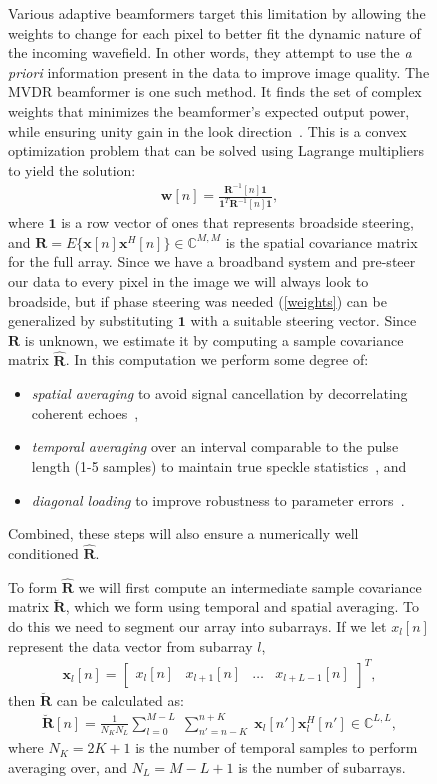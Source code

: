 \documentclass[12pt,journal,draftclsnofoot,onecolumn]{IEEEtran}
\newcommand\bmat[1]{\begin{bmatrix}#1\end{bmatrix}}
\newcommand\sumb[2]{\sum\limits_{#1}^{#2}\;}
\newcommand\T{^{\scriptscriptstyle T}}
\renewcommand\H{^{\scriptscriptstyle H}}
\renewcommand\vec[1]{\boldsymbol{#1}}
\newcommand\mat[1]{\boldsymbol{#1}}
\newcommand\1{\vec 1}
\newcommand*\x{\vec x}
\newcommand*\R{\mat R}
\newcommand*\Ri{\R^{-1}}
\newcommand*\eR{\mat{\hat R}}
\begin{document}
\begin{figure}[H]
Various adaptive beamformers target this limitation by allowing the weights to change for each pixel to better fit the dynamic nature of the incoming wavefield. In other words, they attempt to use the \emph{a priori} information present in the data to improve image quality. The MVDR beamformer is one such method. It finds the set of complex weights that minimizes the beamformer's expected output power, while ensuring unity gain in the look direction~\cite{Capon1969}. This is a convex optimization problem that can be solved using Lagrange multipliers to yield the solution:
\begin{gather}
\vec w[n] = \frac{\Ri[n]\1}{\1\T\Ri[n]\1},\label{weights}
\end{gather}
where $\1$ is a row vector of ones that represents broadside steering, and $\R=E\{\x[n]\x\H[n]\} \in\mathbb{C}^{M,M}$ is the spatial covariance matrix for the full array. Since we have a broadband system and pre-steer our data to every pixel in the image we will always look to broadside, but if phase steering was needed (\ref{weights}) can be generalized by substituting $\1$ with a suitable steering vector. Since $\R$ is unknown, we estimate it by computing a sample covariance matrix $\eR$. In this computation we perform some degree of:
\begin{itemize}
\item \emph{spatial averaging} to avoid signal cancellation by decorrelating coherent echoes~\cite{Kailath1985},
\item \emph{temporal averaging} over an interval comparable to the pulse length (1-5 samples) to maintain true speckle statistics~\cite{Synnevag2009a}, and
\item \emph{diagonal loading} to improve robustness to parameter errors~\cite{Cox1987,Maksym1979}.
\end{itemize}%
%
%
Combined, these steps will also ensure a numerically well conditioned $\eR$.

To form $\eR$ we will first compute an intermediate sample covariance matrix $\breve{\R}$, which we form using temporal and spatial averaging. To do this we need to segment our array into subarrays. If we let $x_l[n]$ represent the data vector from subarray $l$,
\begin{gather}
\x_l[n] = \bmat{x_l[n] & x_{l+1}[n] & \dots & x_{l+L-1}[n]}\T,
\end{gather}
then $\breve{\R}$ can be calculated as:
\begin{gather}
\breve{\R}[n] =  \frac{1}{N_K N_L} \sumb{l=0}{M-L}\sumb{n'=n-K}{n+K} \x_l[n']\x_l\H[n'] \in\mathbb{C}^{L,L},\label{spatialR}
\end{gather}
where $N_K = 2K+1$ is the number of temporal samples to perform averaging over, and $N_L = M-L+1$ is the number of subarrays.


\end{figure}
\end{document}
